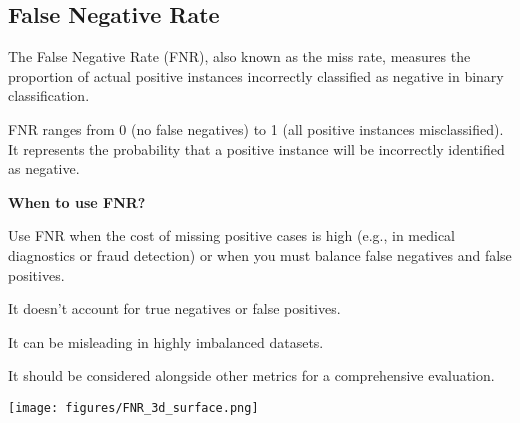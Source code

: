 \subsection{False Negative Rate}
\thispagestyle{classificationstyle}

The False Negative Rate (FNR), also known as the miss rate, measures the proportion of actual positive instances incorrectly classified as negative in binary classification.
\begin{center}
\end{center}

FNR ranges from 0 (no false negatives) to 1 (all positive instances misclassified). It represents the probability that a positive instance will be incorrectly identified as negative.

\textbf{When to use FNR?}

Use FNR when the cost of missing positive cases is high (e.g., in medical diagnostics or fraud detection) or when you must balance false negatives and false positives.

{
\item It doesn't account for true negatives or false positives.
\item It can be misleading in highly imbalanced datasets.
\item It should be considered alongside other metrics for a comprehensive evaluation.
}


\clearpage
\thispagestyle{customstyle}


\begin{figure*}[ht!]
    \centering
    \texttt{[image: figures/FNR\_3d\_surface.png]}
\end{figure*}

